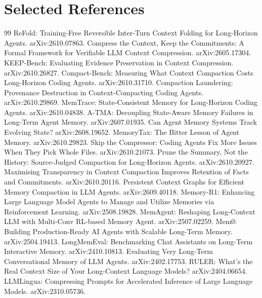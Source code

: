 \documentclass[11pt,a4paper]{article}
\begin{document}
\section{Selected References}
\begin{thebibliography}{99}
 ReFold: Training-Free Reversible Inter-Turn Context Folding for Long-Horizon Agents. arXiv:2610.07863.
 Compress the Context, Keep the Commitments: A Formal Framework for Verifiable LLM Context Compression. arXiv:2605.17304.
 KEEP-Bench: Evaluating Evidence Preservation in Context Compression. arXiv:2610.26827.
 Compact-Bench: Measuring What Context Compaction Costs Long-Horizon Coding Agents. arXiv:2610.31710.
 Compaction Laundering: Provenance Destruction in Context-Compacting Coding Agents. arXiv:2610.29869.
 MemTrace: State-Consistent Memory for Long-Horizon Coding Agents. arXiv:2610.04838.
 A-TMA: Decoupling State-Aware Memory Failures in Long-Term Agent Memory. arXiv:2607.01935.
 Can Agent Memory Systems Track Evolving State? arXiv:2608.19652.
 MemoryTax: The Bitter Lesson of Agent Memory. arXiv:2610.29823.
 Skip the Compressor: Coding Agents Fix More Issues When They Pick Whole Files. arXiv:2610.21073.
 Prune the Summary, Not the History: Source-Judged Compaction for Long-Horizon Agents. arXiv:2610.20927.
 Maximising Transparency in Context Compaction Improves Retention of Facts and Commitments. arXiv:2610.20116.
 Persistent Context Graphs for Efficient Memory Compaction in LLM Agents. arXiv:2609.40118.
 Memory-R1: Enhancing Large Language Model Agents to Manage and Utilize Memories via Reinforcement Learning. arXiv:2508.19828.
 MemAgent: Reshaping Long-Context LLM with Multi-Conv RL-based Memory Agent. arXiv:2507.02259.
 Mem0: Building Production-Ready AI Agents with Scalable Long-Term Memory. arXiv:2504.19413.
 LongMemEval: Benchmarking Chat Assistants on Long-Term Interactive Memory. arXiv:2410.10813.
 Evaluating Very Long-Term Conversational Memory of LLM Agents. arXiv:2402.17753.
 RULER: What's the Real Context Size of Your Long-Context Language Models? arXiv:2404.06654.
 LLMLingua: Compressing Prompts for Accelerated Inference of Large Language Models. arXiv:2310.05736.
\end{thebibliography}
\end{document}
